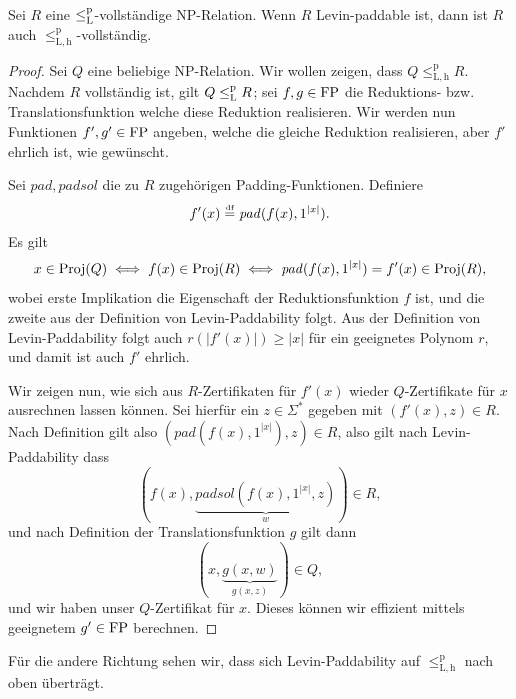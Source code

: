 \begin{lemma}
    Sei $R$ eine $\leq_\mathrm{L}^\mathrm{p}$-vollständige NP-Relation. Wenn $R$ Levin-paddable ist, dann ist 
    $R$ auch $\leq_\mathrm{L,h}^\mathrm p$-vollständig.
\end{lemma}
\begin{proof}
    Sei $Q$ eine beliebige NP-Relation. Wir wollen zeigen, dass $Q\leq_\mathrm{L,h}^\mathrm p R$.
    Nachdem $R$ vollständig ist, gilt $Q\leq_\mathrm{L}^\mathrm{p} R$; sei $f,g\in\mathrm{FP}$ die Reduktions- bzw. Translationsfunktion welche diese Reduktion realisieren. Wir werden nun Funktionen $f', g'\in\mathrm{FP}$ angeben, welche die gleiche Reduktion realisieren, aber $f'$ ehrlich ist, wie gewünscht.

    Sei $\mathit{pad}, \mathit{padsol}$ die zu $R$ zugehörigen Padding-Funktionen. Definiere
    \[ f'(x) \stackrel{\text{{\normalfont\tiny df}}}{=}  \mathit{pad}(f(x), 1^{|x|}). \]
    Es gilt
    \[ x\in\operatorname{Proj}(Q) \iff f(x)\in \operatorname{Proj}(R) \iff \mathit{pad}(f(x), 1^{|x|})=f'(x)\in\operatorname{Proj}(R), \]
    wobei erste Implikation die Eigenschaft der Reduktionsfunktion $f$ ist, und die zweite aus der Definition von Levin-Paddability folgt.
    Aus der Definition von  Levin-Paddability folgt auch $r(|f'(x)|)\geq |x|$ für ein geeignetes Polynom $r$, und damit ist auch $f'$ ehrlich.

    Wir zeigen nun, wie sich aus $R$-Zertifikaten für $f'(x)$ wieder $Q$-Zertifikate für $x$ ausrechnen lassen können.
    Sei hierfür ein $z\in\Sigma^*$ gegeben mit $(f'(x), z)\in R$.
    Nach Definition gilt also $(\mathit{pad}(f(x), 1^{|x|}), z)\in R$, also gilt nach Levin-Paddability dass \[(f(x), \underbrace{\mathit{padsol}(f(x), 1^{|x|}, z)}_w)\in R,\] 
    und nach Definition der Translationsfunktion $g$ gilt dann
    \[(x, \underbrace{g(x, w)}_{g(x,z)})\in Q,\]
    und wir haben unser $Q$-Zertifikat für $x$. Dieses können wir effizient mittels geeignetem $g'\in\mathrm{FP}$ berechnen.
\end{proof}

Für die andere Richtung sehen wir, dass sich Levin-Paddability auf $\leq_\mathrm{L,h}^\mathrm p$ nach oben überträgt. 

